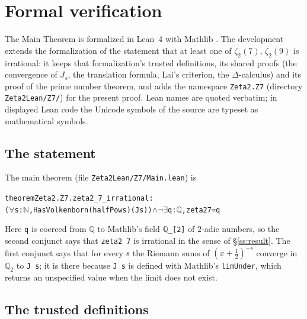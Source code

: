 \documentclass{amsart}
\theoremstyle{definition}
\theoremstyle{remark}
\numberwithin{equation}{section}
\newcommand{\Q}{\mathbb{Q}}
\begin{document}
\section{Formal verification}\label{sec:formal}

The Main Theorem is formalized in Lean~4 \cite{MU21} with Mathlib
\cite{Mathlib20}. The development extends the formalization \cite{DevPair26}
of the statement that at least one of $\zeta_2(7)$, $\zeta_2(9)$ is
irrational: it keeps that formalization's trusted definitions, its shared
proofs (the convergence of $J_s$, the translation formula, Lai's criterion,
the $\Delta$-calculus) and its proof of the prime number theorem, and adds
the namespace \texttt{Zeta2.Z7} (directory \texttt{Zeta2Lean/Z7/}) for the
present proof. Lean names are quoted verbatim; in displayed Lean code the
Unicode symbols of the source are typeset as mathematical symbols.

\subsection{The statement}\label{ss:formal-statement}

The main theorem (file \texttt{Zeta2Lean/Z7/Main.lean}) is
\begin{alltt}\small
theorem Zeta2.Z7.zeta2_7_irrational :
    (\(\forall\) s : \(\mathbb{N}\), HasVolkenborn (halfPow s) (J s)) \(\wedge\) \(\neg\) \(\exists\) q : \(\mathbb{Q}\), zeta2 7 = q
\end{alltt}
Here \texttt{q} is coerced from $\Q$ to Mathlib's field
$\Q$\texttt{\_[2]} of $2$-adic numbers, so the second conjunct says that
\texttt{zeta2~7} is irrational in the sense of \S\ref{ss:result}. The first
conjunct says that for every $s$ the Riemann sums of $(x+\frac12)^{-s}$
converge in $\Q_2$ to \texttt{J~s}; it is there because \texttt{J~s} is
defined with Mathlib's \texttt{limUnder}, which returns an unspecified value
when the limit does not exist.

\subsection{The trusted definitions}\label{ss:formal-defs}
\end{document}
